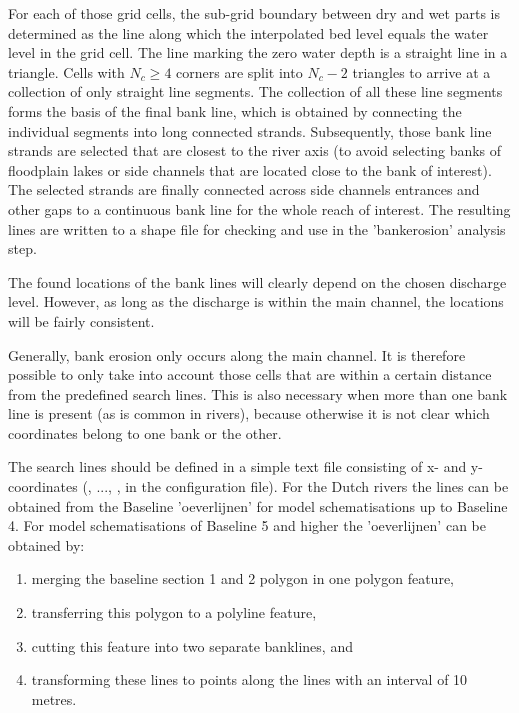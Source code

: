 For each of those grid cells, the sub-grid boundary between dry and wet parts is determined as the line along which the interpolated bed level equals the water level in the grid cell.
The line marking the zero water depth is a straight line in a triangle.
Cells with $N_c \ge 4$ corners are split into $N_c - 2$ triangles to arrive at a collection of only straight line segments.
The collection of all these line segments forms the basis of the final bank line, which is obtained by connecting the individual segments into long connected strands.
Subsequently, those bank line strands are selected that are closest to the river axis (to avoid selecting banks of floodplain lakes or side channels that are located close to the bank of interest).
The selected strands are finally connected across side channels entrances and other gaps to a continuous bank line for the whole reach of interest.
The resulting lines are written to a shape file for checking and use in the 'bankerosion' analysis step.

The found locations of the bank lines will clearly depend on the chosen discharge level.
However, as long as the discharge is within the main channel, the locations will be fairly consistent.

Generally, bank erosion only occurs along the main channel.
It is therefore possible to only take into account those cells that are within a certain distance from the predefined search lines.
This is also necessary when more than one bank line is present (as is common in rivers), because otherwise it is not clear which coordinates belong to one bank or the other.

The search lines should be defined in a simple text file consisting of x- and y- coordinates (, ..., , in the configuration file).
For the Dutch rivers the lines can be obtained from the Baseline 'oeverlijnen' for model schematisations up to Baseline 4.
For model schematisations of Baseline 5 and higher the 'oeverlijnen' can be obtained by:
%
\begin{enumerate}
\item merging the baseline section 1 and 2 polygon in one polygon feature,
\item transferring this polygon to a polyline feature,
\item cutting this feature into two separate banklines, and
\item transforming these lines to points along the lines with an interval of 10 metres.
\end{enumerate}

